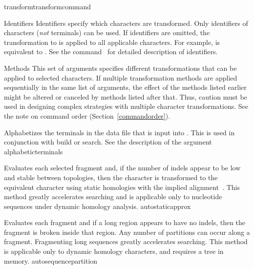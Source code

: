 \begin{command}{transform}{transformcommand}
	\begin{arguments}
	
        \begin{argumentgroup}{Identifiers}
            Identifiers specify which characters are transformed. Only
            identifiers of characters (\emph{not} terminals) can be used. If
            identifiers are omitted, the transformation to is applied to all
            applicable characters. For example,
             is equivalent to
            . See the command~
            for detailed description of identifiers.
        \end{argumentgroup}
           
        \begin{argumentgroup}{Methods}
            This set of arguments specifies different transformations that can be applied
            to selected characters. If multiple transformation methods are applied
            sequentially in the same list of arguments, the effect of the methods listed
            earlier might be altered or canceled by methods listed after that. Thus, caution
            must be used in designing complex strategies with multiple character
            transformations. See the note on command order (Section~\ref{commandorder}).

        {Alphabetizes the terminals in the data file that is input into \poy.  This is used in 
        conjunction with build or search. See the description of the argument 
        }
        {alphabeticterminals}
        
            {Evaluates each selected fragment and, if the number of indels
            appear to be low and stable between topologies, then the character
            is transformed to the equivalent character using static homologies
            with the implied alignment~\cite{wheeler2003}.
            This method greatly accelerates searching and is applicable only to 
            nucleotide sequences under dynamic homology analysis.}
            {autostaticapprox}

            {Evaluates each fragment and if a long region appears 
            to have no indels, then the fragment is broken inside that region.
            Any number of partitions can occur along a fragment. Fragmenting
            long sequences greatly accelerates searching. This method is
            applicable only to dynamic homology characters, and requires a tree
            in memory.}
            {autosequencepartition}
            

\end{argumentgroup}
\end{arguments}
\end{command}
